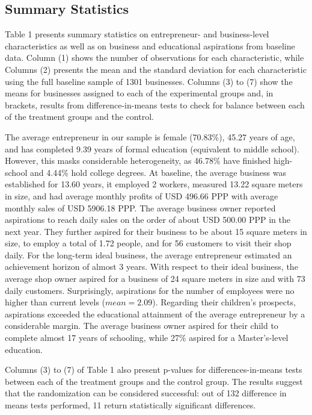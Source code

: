 \documentclass[11.5pt]{article}
\begin{document}
\subsection{Summary Statistics}

Table 1 presents summary statistics on entrepreneur- and business-level characteristics as well as on business and educational aspirations from baseline data. Column (1) shows the number of observations for each characteristic, while Columns (2) presents the mean and the standard deviation for each characteristic using the full baseline sample of 1301 businesses. Columns (3) to (7) show the means for businesses assigned to each of the experimental groups and, in brackets, results from difference-in-means tests to check for balance between each of the treatment groups and the control.

The average entrepreneur in our sample is female (70.83\%), 45.27 years of age, and has completed 9.39 years of formal education (equivalent to middle school). However, this masks considerable heterogeneity, as 46.78\% have finished high-school and 4.44\% hold college degrees. At baseline, the average business was established for 13.60 years, it employed 2 workers, measured 13.22 square meters in size, and had average monthly profits of USD 496.66 PPP with average monthly sales of USD 5906.18 PPP. The average business owner reported aspirations to reach daily sales on the order of about USD 500.00 PPP in the next year. They further aspired for their business to be about 15 square meters in size, to employ a total of 1.72 people, and for 56 customers to visit their shop daily. For the long-term ideal business, the average entrepreneur estimated an achievement horizon of almost 3 years. With respect to their ideal business, the average shop owner aspired for a business of 24 square meters in size and with 73 daily customers. Surprisingly, aspirations for the number of employees were no higher than current levels ($mean = 2.09$). Regarding their children's prospects, aspirations exceeded the educational attainment of the average entrepreneur by a considerable margin. The average business owner aspired for their child to complete almost 17 years of schooling, while 27\% aspired for a Master's-level education.

Columns (3) to (7) of Table 1 also present p-values for differences-in-means tests between each of the treatment groups and the control group. The results suggest that the randomization can be considered successful: out of 132 difference in means tests performed, 11 return statistically significant differences.
\end{document}
